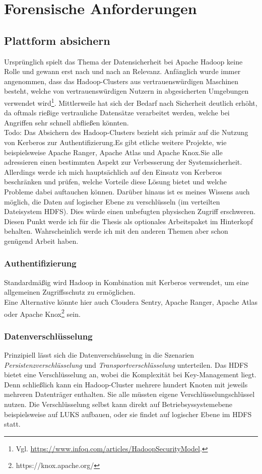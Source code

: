\section{Forensische Anforderungen}

\subsection{Plattform absichern}
Ursprünglich spielt das Thema der Datensicherheit bei Apache Hadoop keine Rolle und gewann erst nach und nach an Relevanz. Anfänglich wurde immer angenommen, dass das Hadoop-Clusters aus vertrauenswürdigen Maschinen besteht, welche von vertrauenswürdigen Nutzern in abgesicherten Umgebungen verwendet wird\footnote{Vgl. \url{https://www.infoq.com/articles/HadoopSecurityModel}.}. Mittlerweile hat sich der Bedarf nach Sicherheit deutlich erhöht, da oftmals rießige vertrauliche Datensätze verarbeitet werden, welche bei Angriffen sehr schnell abfließen könnten.\\

\noindent
Todo:
Das Absichern des Hadoop-Clusters bezieht sich primär auf die Nutzung von Kerberos zur Authentifizierung.Es gibt etliche weitere Projekte, wie beispielsweise Apache Ranger, Apache Atlas und Apache Knox.Sie alle adressieren einen bestimmten Aspekt zur Verbesserung der Systemsicherheit. Allerdings werde ich mich hauptsächlich auf den Einsatz von Kerberos beschränken und prüfen, welche Vorteile diese Lösung bietet und welche Probleme dabei auftauchen können. Darüber hinaus ist es meines Wissens auch möglich, die Daten auf logischer Ebene zu verschlüsseln (im verteilten Dateisystem HDFS). Dies würde einen unbefugten physischen Zugriff erschweren. Diesen Punkt werde ich für die Thesis als optionales Arbeitspaket im Hinterkopf behalten. Wahrscheinlich werde ich mit den anderen Themen aber schon genügend Arbeit haben. 
\subsubsection{Authentifizierung}
Standardmäßig wird Hadoop in Kombination mit Kerberos verwendet, um eine allgemeinen Zugriffsschutz zu ermöglichen.\cite{hadoop_security}\\
Eine Alternative könnte hier auch Cloudera Sentry, Apache Ranger, Apache Atlas oder Apache Knox\footnote{https://knox.apache.org/} sein.
\subsubsection{Datenverschlüsselung}
Prinzipiell lässt sich die Datenverschüsselung in die Szenarien \textit{Persistenzverschlüsselung} und \textit{Transportverschlüsselung} unterteilen. Das HDFS bietet eine Verschlüsselung an, wobei die Komplexität bei Key-Management liegt. Denn schließlich kann ein Hadoop-Cluster mehrere hundert Knoten mit jeweils mehreren Datenträger enthalten. Sie alle müssten eigene Verschlüsselungschlüssel nutzen. Die Verschlüsselung selbst kann direkt auf Betriebsyssystemebene beispielsweise auf LUKS aufbauen, oder sie findet auf logischer Ebene im HDFS statt.\cite{hadoop_security}\\

